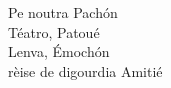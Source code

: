 \cleardoublepage
\begin{center}
\thispagestyle{empty}
\vspace*{\fill}
\Large
\ECFJD
Pe noutra Pach\'on\\
Téatro, Patoué\\
Lenva, \'Emoch\'on\\
rèise de digourdia Amitié
\vspace*{\fill}
\end{center}
\newpage


